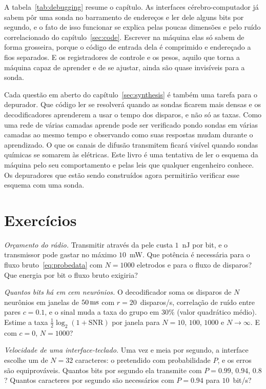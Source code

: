 A tabela~\ref{tab:debugging} resume o capítulo. As interfaces cérebro-computador já sabem pôr uma sonda no barramento de endereços e ler dele alguns bits por segundo, e o fato de isso funcionar se explica pelas poucas dimensões e pelo ruído correlacionado do capítulo~\ref{sec:code}. Escrever na máquina elas só sabem de forma grosseira, porque o código de entrada dela é comprimido e endereçado a fios separados. E os registradores de controle e os pesos, aquilo que torna a máquina capaz de aprender e de se ajustar, ainda são quase invisíveis para a sonda.

Cada questão em aberto do capítulo~\ref{sec:synthesis} é também uma tarefa para o depurador. Que código ler se resolverá quando as sondas ficarem mais densas e os decodificadores aprenderem a usar o tempo dos disparos, e não só as taxas. Como uma rede de várias camadas aprende pode ser verificado pondo sondas em várias camadas ao mesmo tempo e observando como suas respostas mudam durante o aprendizado. O que os canais de difusão transmitem ficará visível quando sondas químicas se somarem às elétricas. Este livro é uma tentativa de ler o esquema da máquina pelo seu comportamento e pelas leis que qualquer engenheiro conhece. Os depuradores que estão sendo construídos agora permitirão verificar esse esquema com uma sonda.

\section{Exercícios}

\begin{exercise}[\lvlA]
\label{ex:17:1}
\emph{Orçamento do rádio.} Transmitir através da pele custa $1$~nJ por bit, e o transmissor pode gastar no máximo $10$~mW. Que potência é necessária para o fluxo bruto~\eqref{eq:probedata} com $N=1000$ eletrodos e para o fluxo de disparos? Que energia por bit o fluxo bruto exigiria?
\end{exercise}

\begin{exercise}[\lvlA]
\label{ex:17:2}
\emph{Quantos bits há em cem neurônios.} O decodificador soma os disparos de $N$ neurônios em janelas de $50\,\text{ms}$ com $r=20$~disparos/s, correlação de ruído entre pares $c=0.1$, e o sinal muda a taxa do grupo em $30\%$ (valor quadrático médio). Estime a taxa $\tfrac12\log_2(1+\text{SNR})$ por janela para $N=10$, $100$, $1000$ e $N\to\infty$. E com $c=0$, $N=1000$?
\end{exercise}

\begin{exercise}[\lvlB]
\label{ex:17:3}
\emph{Velocidade de uma interface-teclado.} Uma vez e meia por segundo, a interface escolhe um de $N=32$ caracteres: o pretendido com probabilidade $P$, e os erros são equiprováveis. Quantos bits por segundo ela transmite com $P=0.99$, $0.94$, $0.8$? Quantos caracteres por segundo são necessários com $P=0.94$ para $10$~bit/s?
\end{exercise}


